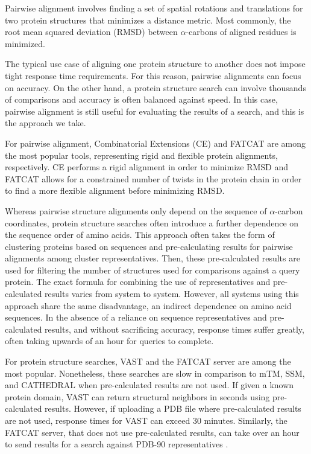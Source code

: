\documentclass[a4,center,fleqn]{NAR}
\newcommand{\ca}{$\alpha$-carbon\xspace}
\newcommand{\cas}{$\alpha$-carbons\xspace}
\begin{document}
Pairwise alignment involves finding a set of spatial rotations and translations for two protein structures that minimizes a distance metric. 
Most commonly, the root mean squared deviation (RMSD) between \cas of aligned residues is minimized.

The typical use case of aligning one protein structure to another does not impose tight response time requirements. 
For this reason, pairwise alignments can focus on accuracy. 
On the other hand, a protein structure search can involve thousands of comparisons and accuracy is often balanced against speed. 
In this case, pairwise alignment is still useful for evaluating the results of a search, and this is the approach we take. 

For pairwise alignment, Combinatorial Extensions (CE) \cite{Shindyalov1998} and FATCAT \cite{Ye2003} are among the most popular tools, representing rigid and flexible protein alignments, respectively. 
CE performs a rigid alignment in order to minimize RMSD and FATCAT allows for a constrained number of twists in the protein chain in order to find a more flexible alignment before minimizing RMSD.

Whereas pairwise structure alignments only depend on the sequence of \ca coordinates, protein structure searches often introduce a further dependence on the sequence order of amino acids.
This approach often takes the form of clustering proteins based on sequences and pre-calculating results for pairwise alignments among cluster representatives. 
Then, these pre-calculated results are used for filtering the number of structures used for comparisons against a query protein.
The exact formula for combining the use of representatives and pre-calculated results varies from system to system.
However, all systems using this approach share the same disadvantage, an indirect dependence on amino acid sequences. 
In the absence of a reliance on sequence representatives and pre-calculated results, and without sacrificing accuracy, response times suffer greatly, often taking upwards of an hour for queries to complete. 

For protein structure searches, VAST \cite{Gilbrat1996} and the FATCAT server \cite{Ye2004} are among the most popular. 
Nonetheless, these searches are slow in comparison to mTM, SSM, and CATHEDRAL when pre-calculated results are not used. 
If given a known protein domain, VAST can return structural neighbors in seconds using pre-calculated results. 
However, if uploading a PDB file where pre-calculated results are not used, response times for VAST can exceed 30 minutes. 
Similarly, the FATCAT server, that does not use pre-calculated results, can take over an hour to send results for a search against PDB-90 representatives \cite{Prlic2010}. 
\end{document}
